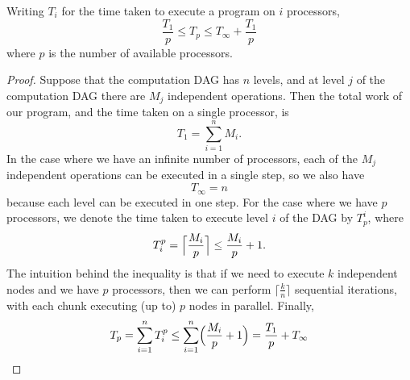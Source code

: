   \begin{theorem}
    Writing $T_{i}$ for the time taken to execute a program on $i$
    processors,
  \[
    \frac{T_{1}}{p} \leq T_{p} \leq T_{\infty} + \frac{T_{1}}{p}
  \]
  where $p$ is the number of available processors.

  \begin{proof}
    Suppose that the computation DAG has $n$ levels, and at level $j$
    of the computation DAG there are $M_{j}$ independent operations.
    Then the total work of our program, and the time taken on a single
    processor, is
  \[
    T_{1} = \sum_{i=1}^{n}M_{i}.
  \]
  In the case where we have an infinite number of processors, each of
  the $M_{j}$ independent operations can be executed in a single step, so we also have
  \[
    T_{\infty} = n
  \]
  because each level can be executed in one step. For the case where we
  have $p$ processors, we denote the time taken to execute level $i$
  of the DAG by $T_{p}^{i}$, where
  \[
    T_{i}^{p} = \Bigl\lceil{\frac{M_{i}}{p}}\Bigr\rceil \leq
    \frac{M_{i}}{p}+1.
  \]
  The intuition behind the inequality is that if we need to execute
  $k$ independent nodes and we have $p$ processors, then we can
  perform $\lceil \frac{k}{n} \rceil$ sequential iterations, with each
  chunk executing (up to) $p$ nodes in parallel. Finally,
  \[
    T_{p} = \sum_{i=1}^{n}T_{i}^{p} \leq \sum_{i=1}^{n}\Bigl(\frac{M_{i}}{p}+1\Bigr) = \frac{T_{1}}{p} + T_{\infty}
  \]
  \end{proof}

  \end{theorem}


